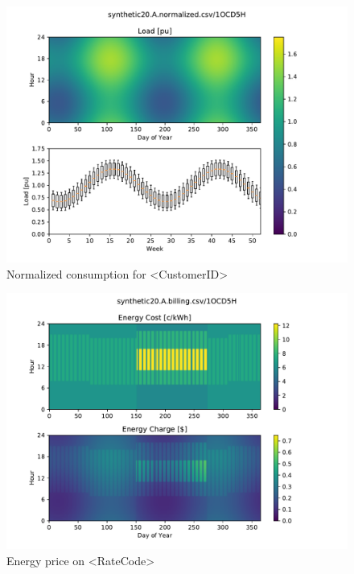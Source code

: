 \documentclass[11pt]{article}
\begin{document}
\begin{figure}[!h]
\centering
\includegraphics[width=\columnwidth, page=1, trim=0in 0.45in 0in 0.45in, clip]{visuals/synthetic20.A.heatmaps.pdf}
\caption{Normalized consumption for <CustomerID>}
\label{fig:heatmap}
\end{figure}

\begin{figure}[!h]
\centering
\includegraphics[width=\columnwidth, page=1, trim=0in 3in 0in 0.45in, clip]{visuals/synthetic20.A.billing.Heatmaps.pdf}
\caption{Energy price on <RateCode>}
\label{fig:heatmap}
\end{figure}

\lipsum[1][1-7]
\end{document}
